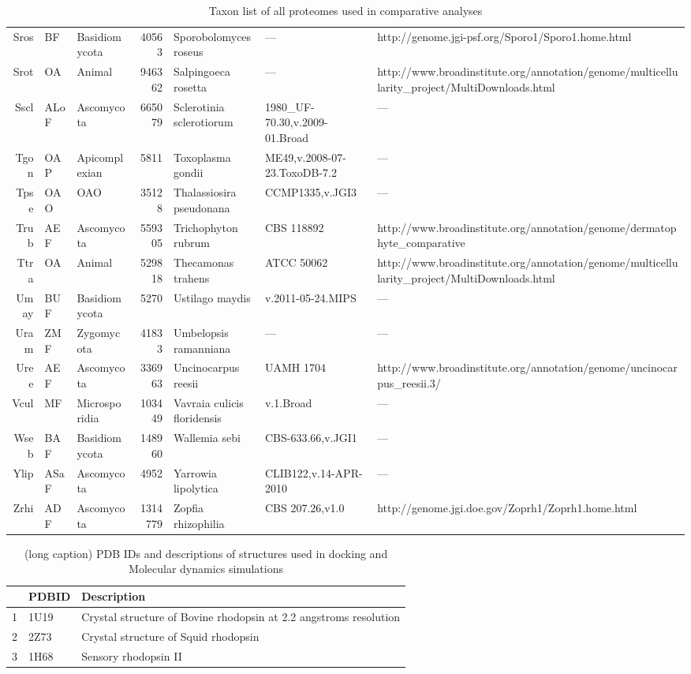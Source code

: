 {\begin{table}[tbp]
\begin{tabular}{rllrlll}
  Sros & BF & Basidiomycota & 40563 & Sporobolomyces roseus & --- & http://genome.jgi-psf.org/Sporo1/Sporo1.home.html \\ 
  Srot & OA & Animal & 946362 & Salpingoeca rosetta & --- & http://www.broadinstitute.org/annotation/genome/multicellularity\_project/MultiDownloads.html \\ 
  Sscl & ALoF & Ascomycota & 665079 & Sclerotinia sclerotiorum & 1980\_UF-70.30,v.2009-01.Broad & --- \\ 
  Tgon & OAP & Apicomplexian & 5811 & Toxoplasma gondii & ME49,v.2008-07-23.ToxoDB-7.2 & --- \\ 
  Tpse & OAO & OAO & 35128 & Thalassiosira pseudonana & CCMP1335,v.JGI3 & --- \\ 
  Trub & AEF & Ascomycota & 559305 & Trichophyton rubrum & CBS 118892 & http://www.broadinstitute.org/annotation/genome/dermatophyte\_comparative \\ 
  Ttra & OA & Animal & 529818 & Thecamonas trahens & ATCC 50062 & http://www.broadinstitute.org/annotation/genome/multicellularity\_project/MultiDownloads.html \\ 
  Umay & BUF & Basidiomycota & 5270 & Ustilago maydis & v.2011-05-24.MIPS & --- \\ 
  Uram & ZMF & Zygomycota & 41833 & Umbelopsis ramanniana & --- & --- \\ 
  Uree & AEF & Ascomycota & 336963 & Uncinocarpus reesii & UAMH 1704 & http://www.broadinstitute.org/annotation/genome/uncinocarpus\_reesii.3/ \\ 
  Vcul & MF & Microsporidia & 103449 & Vavraia culicis floridensis & v.1.Broad & --- \\ 
  Wseb & BAF & Basidiomycota & 148960 & Wallemia sebi & CBS-633.66,v.JGI1 & --- \\ 
  Ylip & ASaF & Ascomycota & 4952 & Yarrowia lipolytica & CLIB122,v.14-APR-2010 & --- \\ 
  Zrhi & ADF & Ascomycota & 1314779 & Zopfia rhizophilia & CBS 207.26,v1.0 & http://genome.jgi.doe.gov/Zoprh1/Zoprh1.home.html \\ 
\bottomrule
\end{tabular}
\caption[List of proteomes]{Taxon list of all proteomes used in comparative analyses} 
\label{tab:AppData_taxa}
\end{table}}
\begin{table}[tbp]
\centering
\begin{tabular}{rll}
  \hline
\hline
 & PDBID & Description \\ 
  \hline
1 & 1U19 & Crystal structure of Bovine rhodopsin at 2.2 angstroms resolution \\ 
  2 & 2Z73 & Crystal structure of Squid rhodopsin \\ 
  3 & 1H68 & Sensory rhodopsin II \\ 
   \hline
\hline
\end{tabular}
\caption[(short caption) PDB IDs and descriptions of structures used in comparative analyses]{(long caption) PDB IDs and descriptions of structures used in docking and Molecular dynamics simulations} 
\label{tab:AppData_PDB}
\end{table}
